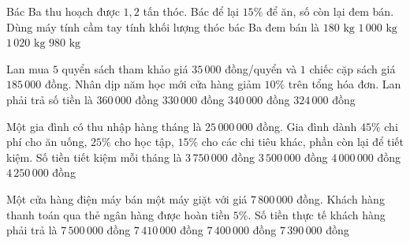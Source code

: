 \begin{ex} %
Bác Ba thu hoạch được $1{,}2$ tấn thóc. Bác để lại $15\%$ để ăn, số còn lại đem bán. Dùng máy tính cầm tay tính khối lượng thóc bác Ba đem bán là
\choice
{$180\text{ kg}$}
{$1\,000\text{ kg}$}
{\True $1\,020\text{ kg}$}
{$980\text{ kg}$}
\end{ex}

\begin{ex} %
Lan mua $5$ quyển sách tham khảo giá $35\,000$ đồng/quyển và $1$ chiếc cặp sách giá $185\,000$ đồng. Nhân dịp năm học mới cửa hàng giảm $10\%$ trên tổng hóa đơn. Lan phải trả số tiền là
\choice
{$360\,000$ đồng}
{$330\,000$ đồng}
{$340\,000$ đồng}
{\True $324\,000$ đồng}
\end{ex}

\begin{ex} %
Một gia đình có thu nhập hàng tháng là $25\,000\,000$ đồng. Gia đình dành $45\%$ chi phí cho ăn uống, $25\%$ cho học tập, $15\%$ cho các chi tiêu khác, phần còn lại để tiết kiệm. Số tiền tiết kiệm mỗi tháng là
\choice
{\True $3\,750\,000$ đồng}
{$3\,500\,000$ đồng}
{$4\,000\,000$ đồng}
{$4\,250\,000$ đồng}
\end{ex}

\begin{ex} %
Một cửa hàng điện máy bán một máy giặt với giá $7\,800\,000$ đồng. Khách hàng thanh toán qua thẻ ngân hàng được hoàn tiền $5\%$. Số tiền thực tế khách hàng phải trả là
\choice
{$7\,500\,000$ đồng}
{\True $7\,410\,000$ đồng}
{$7\,400\,000$ đồng}
{$7\,390\,000$ đồng}
\end{ex}

